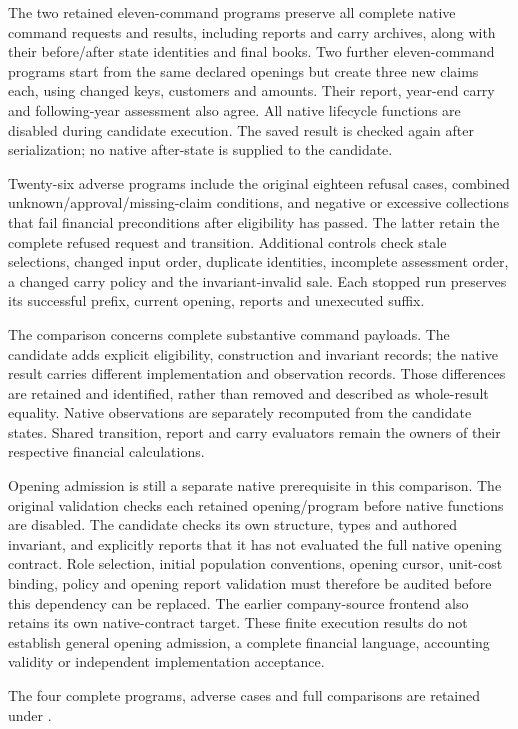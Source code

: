 The two retained eleven-command programs preserve all complete native command
requests and results, including reports and carry archives, along with their
before/after state identities and final books. Two further eleven-command
programs start from the same declared openings but create three new claims each,
using changed keys, customers and amounts. Their report, year-end carry and
following-year assessment also agree. All native lifecycle functions are
disabled during candidate execution. The saved result is checked again after
serialization; no native after-state is supplied to the candidate.

Twenty-six adverse programs include the original eighteen refusal cases,
combined unknown/approval/missing-claim conditions, and negative or excessive
collections that fail financial preconditions after eligibility has passed.
The latter retain the complete refused request and transition. Additional
controls check stale selections, changed input order, duplicate identities,
incomplete assessment order, a changed carry policy and the invariant-invalid
sale. Each stopped run preserves its successful prefix, current opening,
reports and unexecuted suffix.

The comparison concerns complete substantive command payloads. The candidate
adds explicit eligibility, construction and invariant records; the native
result carries different implementation and observation records. Those
differences are retained and identified, rather than removed and described as
whole-result equality. Native observations are separately recomputed from the
candidate states. Shared transition, report and carry evaluators remain the
owners of their respective financial calculations.

Opening admission is still a separate native prerequisite in this comparison.
The original validation checks each retained opening/program before native
functions are disabled. The candidate checks its own structure, types and
authored invariant, and explicitly reports that it has not evaluated the full
native opening contract. Role selection, initial population conventions,
opening cursor, unit-cost binding, policy and opening report validation must
therefore be audited before this dependency can be replaced. The earlier
company-source frontend also retains its own native-contract target. These
finite execution results do not establish general opening admission, a complete
financial language, accounting validity or independent implementation acceptance.

\begingroup\raggedright
The four complete programs, adverse cases and full comparisons are retained
under .
\par
\endgroup

